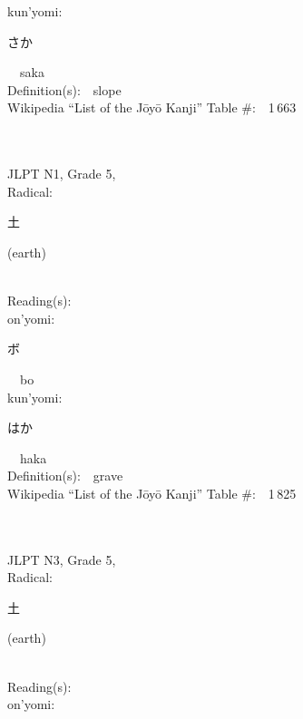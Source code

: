 \begin{multicols}{2}
{\hspace*{1em}}kun'yomi:\ \ \\
{\hspace*{2em}}{\begin{CJK}{UTF8}{min} さか \end{CJK}}\ \ saka\ \ \\
Definition(s):\ \ slope \\
Wikipedia ``List of the J\=oy\=o Kanji'' Table \#:\ \ 1\,663 \\
\ \ \\
{\fontsize{34pt}{40pt}  }\ \ \\  %
{JLPT N1, Grade 5, \\Radical:\ \ {\begin{CJK}{UTF8}{min} 土 \end{CJK}} (earth) } \\
Reading(s):\ \ \\
{\hspace*{1em}}on'yomi:\ \ \\
{\hspace*{2em}}{\begin{CJK}{UTF8}{min} ボ \end{CJK}}\ \ bo\ \ \\
{\hspace*{1em}}kun'yomi:\ \ \\
{\hspace*{2em}}{\begin{CJK}{UTF8}{min} はか \end{CJK}}\ \ haka\ \ \\
Definition(s):\ \ grave \\
Wikipedia ``List of the J\=oy\=o Kanji'' Table \#:\ \ 1\,825 \\
\ \ \\
{\fontsize{34pt}{40pt}  }\ \ \\  %
{JLPT N3, Grade 5, \\Radical:\ \ {\begin{CJK}{UTF8}{min} 土 \end{CJK}} (earth) } \\
Reading(s):\ \ \\
{\hspace*{1em}}on'yomi:\ \ \\

\end{multicols}
